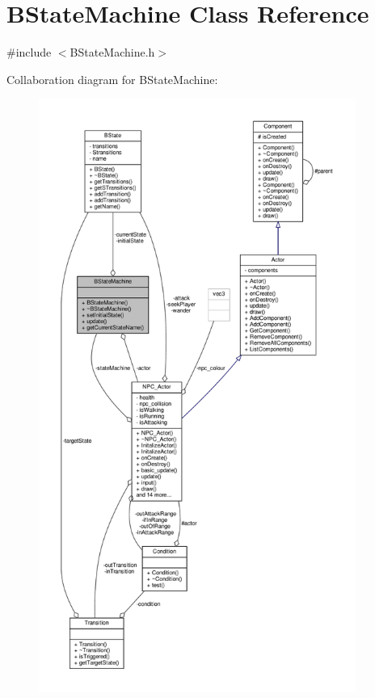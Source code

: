 \hypertarget{classBStateMachine}{}\section{B\+State\+Machine Class Reference}
\label{classBStateMachine}


{\ttfamily \#include $<$B\+State\+Machine.\+h$>$}



Collaboration diagram for B\+State\+Machine\+:
\nopagebreak
\begin{figure}[H]
\begin{center}
\leavevmode
\includegraphics[height=550pt]{classBStateMachine__coll__graph}
\end{center}
\end{figure}
